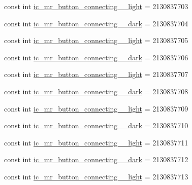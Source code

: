 \begin{DoxyCompactItemize}
const int \mbox{\hyperlink{class_f_w_p_s___app_1_1_droid_1_1_resource_1_1_drawable_abb45e0731c2aeb7d30a4420fd1a37080}{ic\+\_\+mr\+\_\+button\+\_\+connecting\+\_\+\_\+light}} = 2130837703
\item 
const int \mbox{\hyperlink{class_f_w_p_s___app_1_1_droid_1_1_resource_1_1_drawable_a805353c2b774040c038e7d7bc6018c0c}{ic\+\_\+mr\+\_\+button\+\_\+connecting\+\_\+\_\+dark}} = 2130837704
\item 
const int \mbox{\hyperlink{class_f_w_p_s___app_1_1_droid_1_1_resource_1_1_drawable_a33c57d8c29d28f885ba084e3ffeb747b}{ic\+\_\+mr\+\_\+button\+\_\+connecting\+\_\+\_\+light}} = 2130837705
\item 
const int \mbox{\hyperlink{class_f_w_p_s___app_1_1_droid_1_1_resource_1_1_drawable_a8b3e9ef5e0e19b32cef107dca367576c}{ic\+\_\+mr\+\_\+button\+\_\+connecting\+\_\+\_\+dark}} = 2130837706
\item 
const int \mbox{\hyperlink{class_f_w_p_s___app_1_1_droid_1_1_resource_1_1_drawable_a1767e4cea03e92062648c518d611e47c}{ic\+\_\+mr\+\_\+button\+\_\+connecting\+\_\+\_\+light}} = 2130837707
\item 
const int \mbox{\hyperlink{class_f_w_p_s___app_1_1_droid_1_1_resource_1_1_drawable_a0b098e93bd6c5aa5f272b9e7f67d60b0}{ic\+\_\+mr\+\_\+button\+\_\+connecting\+\_\+\_\+dark}} = 2130837708
\item 
const int \mbox{\hyperlink{class_f_w_p_s___app_1_1_droid_1_1_resource_1_1_drawable_a25b0c247180d3171d36bd442599bfe51}{ic\+\_\+mr\+\_\+button\+\_\+connecting\+\_\+\_\+light}} = 2130837709
\item 
const int \mbox{\hyperlink{class_f_w_p_s___app_1_1_droid_1_1_resource_1_1_drawable_a766e2923f3ae7c3e4aa7e25397fbb6e1}{ic\+\_\+mr\+\_\+button\+\_\+connecting\+\_\+\_\+dark}} = 2130837710
\item 
const int \mbox{\hyperlink{class_f_w_p_s___app_1_1_droid_1_1_resource_1_1_drawable_a99040cd481eb78f04df2cc9e1b08232a}{ic\+\_\+mr\+\_\+button\+\_\+connecting\+\_\+\_\+light}} = 2130837711
\item 
const int \mbox{\hyperlink{class_f_w_p_s___app_1_1_droid_1_1_resource_1_1_drawable_ab61aa988d1cd137ff9af139bf94456ce}{ic\+\_\+mr\+\_\+button\+\_\+connecting\+\_\+\_\+dark}} = 2130837712
\item 
const int \mbox{\hyperlink{class_f_w_p_s___app_1_1_droid_1_1_resource_1_1_drawable_a72de2b942e807b3da6cc1b460204a790}{ic\+\_\+mr\+\_\+button\+\_\+connecting\+\_\+\_\+light}} = 2130837713
\item 

\end{DoxyCompactItemize}
